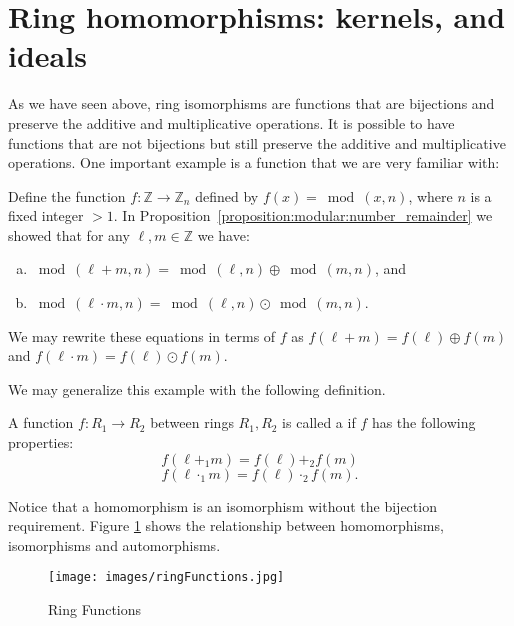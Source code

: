 \section{Ring homomorphisms: kernels, and ideals}
\label{sec:RingHomomorphismKernelsIdeals}

As we have seen above, ring isomorphisms are functions that are bijections and preserve the additive and multiplicative operations. It is possible to have functions that are not bijections but still preserve the additive and multiplicative operations.  One important example is a function that we are very familiar with: 

\begin{example}\label{example:rings:ring_homo}
Define the function $f:{\mathbb Z}\rightarrow {\mathbb Z}_n$ defined by $f(x)=\bmod(x,n)$, where $n$ is a fixed integer $> 1$.  In Proposition~\ref{proposition:modular:number_remainder} we showed that for any $\ell,m \in {\mathbb Z}$ we have:
\begin{enumerate}[(a)]
\item
$\bmod(\ell+ m,n) = \bmod(\ell,n) \oplus \bmod(m,n)$, 
and
\item
$\bmod(\ell \cdot m,n) = \bmod(\ell,n) \odot \bmod(m,n)$.
\end{enumerate}
We may rewrite these equations in terms of $f$ as $f(\ell+ m) = f(\ell) \oplus f(m)$ and $f(\ell\cdot m) = f(\ell) \odot f(m)$. 
\end{example}
We may generalize this example with the following definition.

\begin{defn}\label{homomorph}
A function $f:R_1\rightarrow R_2$ between rings $R_1,R_2$ is called a  if $f$ has the following properties:
\begin{equation}\label{eq:homo_add}
f(\ell+_1 m) = f(\ell) +_2 f(m)
\end{equation} 
\begin{equation}\label{eq:homo_mult}
f(\ell\cdot_1 m) = f(\ell) \cdot_2 f(m).
\end{equation}
\end{defn}
Notice that a homomorphism is an isomorphism without the bijection requirement.  Figure \ref{fig:ring_functions} shows the relationship between homomorphisms, isomorphisms and automorphisms.

\begin{figure}[H]
\begin{center}
\centerline {
\texttt{[image: images/ringFunctions.jpg]} }
\end{center}
\caption{Ring Functions}\label{fig:ring_functions}
\end{figure}

